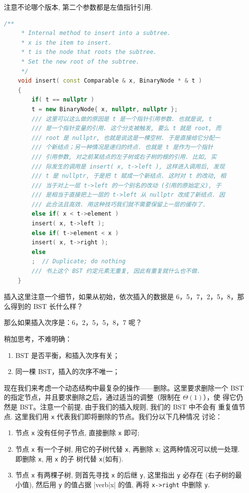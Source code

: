 \documentclass[a4paper]{ctexart}
\theoremstyle{definition}
\theoremstyle{definition}
\begin{document}
注意不论哪个版本, 第二个参数都是左值指针引用. 
\begin{lstlisting}[language=C++]
      /**
     * Internal method to insert into a subtree.
     * x is the item to insert.
     * t is the node that roots the subtree.
     * Set the new root of the subtree.
     */
    void insert( const Comparable & x, BinaryNode * & t )
	{
	    if( t == nullptr )
		t = new BinaryNode{ x, nullptr, nullptr };
	    /// 这里可以这么做的原因是 t 是一个指针引用参数. 也就是说, t
	    /// 是一个指针变量的引用. 这个分支被触发, 要么 t 就是 root, 而
	    /// root 是 nullptr, 也就是说这是一棵空树. 于是直接给它分配一
	    /// 个新结点；另一种情况是递归的终点. 也就是 t 是作为一个指针
	    /// 引用参数, 对之前某结点的左子树或右子树的根的引用. 比如, 实
	    /// 际发生的调用是 insert( x, t->left ), 这样进入调用后, 发现
	    /// t 是 nullptr, 于是把 t 赋成一个新结点. 这时对 t 的改动, 相
	    /// 当于对上一层 t->left 的一个别名的改动 (引用的原始定义), 于
	    /// 是相当于直接把上一层的 t->left 从 nullptr 改成了新结点. 因
	    /// 此合法且高效. 用这种技巧我们就不需要保留上一层的缓存了. 
	    else if( x < t->element )
		insert( x, t->left );
	    else if( t->element < x )
		insert( x, t->right );
	    else
		;  // Duplicate; do nothing
	    /// 书上这个 BST 约定元素无重复, 因此有重复就什么也不做. 
	}
\end{lstlisting}

插入这里注意一个细节，如果从初始，依次插入的数据是 6，5，7，2，5，8，那么得到的 BST 长什么样？


那么如果插入次序是：6，2，5，5，8，7 呢？


稍加思考，不难明确：

\begin{enumerate}
\item BST 是否平衡，和插入次序有关；
\item 同一棵 BST，插入的次序不唯一；
\end{enumerate}

现在我们来考虑一个动态结构中最复杂的操作——删除。这里要求删除一个 BST
的指定节点，并且要求删除之后，通过适当的调整（限制在 $\Theta(1)$），使
得它仍然是 BST。注意一个前提, 由于我们的插入规则, 我们的 BST 中不会有
重复值节点. 这里我们用 \verb|x| 代表我们即将删除的节点。我们分以下几种情况
讨论：

\begin{enumerate}
\item 节点 \verb|x| 没有任何子节点, 直接删除 \verb|x| 即可; 
\item 节点 \verb|x| 有一个子树, 用它的子树代替 \verb|x|, 再删除
  \verb|x|; 这两种情况可以统一处理. 即删除 \verb|x|, 用 \verb|x| 的子
  树代替 \verb|x|(如有).
\item 节点 \verb|x| 有两棵子树, 则首先寻找 \verb|x| 的后继 \verb|y|,
  这里指出 \verb|y| 必存在 (右子树的最小值), 然后用 \verb|y| 的值占据
  |verb|x| 的值, 再将 \verb|x->right| 中删除 \verb|y|.
\end{enumerate}
\end{document}
